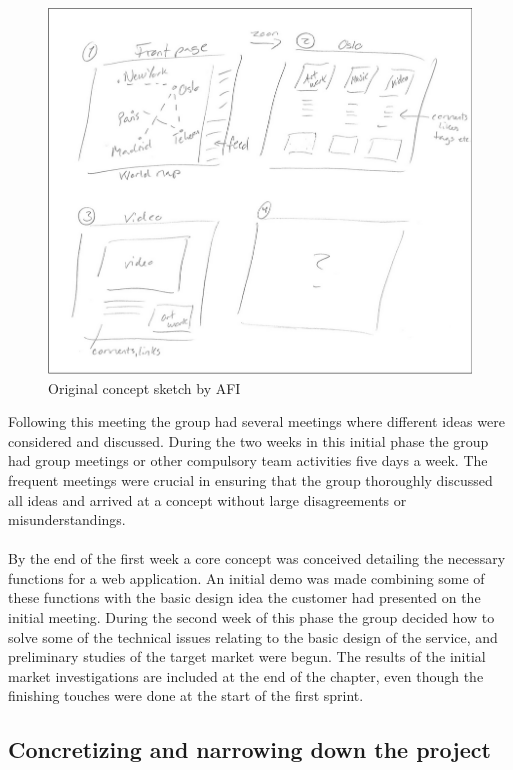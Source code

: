 \begin{figure}[ht!]
  \includegraphics[width=\linewidth]{./PreliminaryStudies/img/conceptSketch}
  \caption{Original concept sketch by AFI}
  \label{fig:PrelimWorkSketch}
\end{figure}

Following this meeting the group had several meetings where different ideas were considered and discussed. During the two weeks in this initial phase the group had group meetings or other compulsory team activities five days a week. The frequent meetings were crucial in ensuring that the group thoroughly discussed all ideas and arrived at a concept without large disagreements or misunderstandings.
\paragraph{} By the end of the first week a core concept was conceived detailing the necessary functions for a web application. An initial demo was made combining some of these functions with the basic design idea the customer had presented on the initial meeting. During the second week of this phase the group decided how to solve some of the technical issues relating to the basic design of the service, and preliminary studies of the target market were begun. The results of the initial market investigations are included at the end of the chapter, even though the finishing touches were done at the start of the first sprint.

\subsection{Concretizing and narrowing down the project}
\label{subsec:PrelimWorkConcret}

